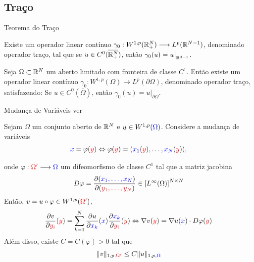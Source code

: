 \subsection*{Traço}

\begin{frame}{Teorema do Traço}


\begin{teo}[Caso \(\Omega=\rd_+\)] 
Existe um operador linear contínuo \(\gamma_0: W^{1,p}(\mathbb{R}^N_+)\longrightarrow L^p({\mathbb{R}^N}{}^{-1})\), denominado {\color{blue} operador traço}, tal que 
se \(u\in C^0(\overline{\mathbb{R}^N_+})\), então \(\gamma_0(u)=u\big\vert_{\mathbb{R}^{d-1}}\).
\end{teo}

\begin{teo} 
Seja $\Omega\subset \mathbb{R}^N$ um {\color{blue} aberto limitado} {\color{red} com fronteira {de classe $C^1$}}. Então existe um operador linear contínuo \(\gamma_0: W^{1,p}(\Omega)\longrightarrow L^p(\partial \Omega)\), denominado {\color{blue} operador traço}, satisfazendo:
Se \(u\in C^0(\overline{\Omega})\), então \(\gamma_0(u)=u\big\vert_{\partial\Omega}\).
\end{teo}

\end{frame}

\begin{frame}{Mudança de Variáveis ver {\cite[Proposição 2.21]{cavalcanti-dist}} }

Sejam {\color{blue}\(\Omega\)} um conjunto aberto de \(\mathbb{R}^N\) e  \(u\in W^{1,p}({\color{blue}\Omega})\). Considere a mudança de variáveis 
\[
{\color{blue}x}=\varphi({\color{red}y}) \Leftrightarrow \varphi({\color{red}y})=({\color{blue}x_1}({\color{red}y}),\ldots,{\color{blue}x_N}({\color{red}y})),
\]

onde   \(\varphi: {\color{red}\Omega'}\longrightarrow {\color{blue}\Omega}\) um {\color{blue}difeomorfismo de classe \(C^1\)} tal que a matriz jacobina
\[
D\varphi=\frac{\partial({\color{blue}x_1,\ldots,x_N})}{\partial({\color{red}y_1,\ldots,y_N})}\in  \left[L^\infty(\Omega)\right]^{N\times N}
\]
Então,  \(v=u\circ\varphi\in W^{1,p}({\color{red}\Omega'})\),
\[
\frac{\partial v}{\partial {\color{red}y_i}}({\color{red}y})=\sum_{k=1}^{N}\frac{\partial u}{\partial {\color{blue}x_k}}({\color{blue}x}) \frac{\partial {\color{blue}x_k}}{\partial {\color{red}y_i}}({\color{red}y}) \Leftrightarrow \nabla v({\color{red}y})=\nabla u({\color{blue}x})\cdot D\varphi({\color{red}y})
\]
Além disso,  existe \(C=C(\varphi)>0\) tal que
\[
\lVert v\rVert_{1,p,{\color{red}\Omega'}}\leq C\lVert u\rVert_{1,p,{\color{blue}\Omega}}
\]


\end{frame}

